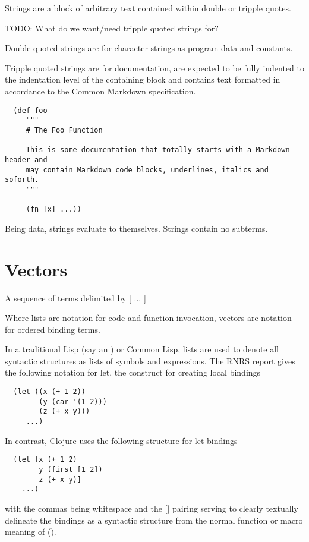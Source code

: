 \documentclass{report}
\def\rnrs{RNRS }
\begin{document}
Strings are a block of arbitrary text contained within double or tripple quotes.

TODO: What do we want/need tripple quoted strings for?

Double quoted strings are for character strings as program data and constants.

Tripple quoted strings are for documentation, are expected to be fully
indented to the indentation level of the containing block and contains text
formatted in accordance to the Common Markdown specification.

\begin{lstlisting}
  (def foo
     """
     # The Foo Function
   
     This is some documentation that totally starts with a Markdown header and
     may contain Markdown code blocks, underlines, italics and soforth.
     """
   
     (fn [x] ...))
\end{lstlisting}

Being data, strings evaluate to themselves. Strings contain no subterms.

\section{Vectors}


A sequence of terms delimited by [ ... ]

Where lists are notation for code and function invocation, vectors are
notation for ordered binding terms.

In a traditional Lisp (say an ) or Common Lisp, lists are used to
denote all syntactic structures as lists of symbols and expressions. The
\rnrs report gives the following notation for let, the construct for
creating local bindings

\begin{lstlisting}
  (let ((x (+ 1 2))
        (y (car '(1 2)))
        (z (+ x y)))
     ...)
\end{lstlisting}

In contrast, Clojure uses the following structure for let bindings

\begin{lstlisting}
  (let [x (+ 1 2)
        y (first [1 2])
        z (+ x y)]
    ...)
\end{lstlisting}

with the commas being whitespace and the [] pairing serving to clearly
textually delineate the bindings as a syntactic structure from the normal
function or macro meaning of ().
\end{document}
